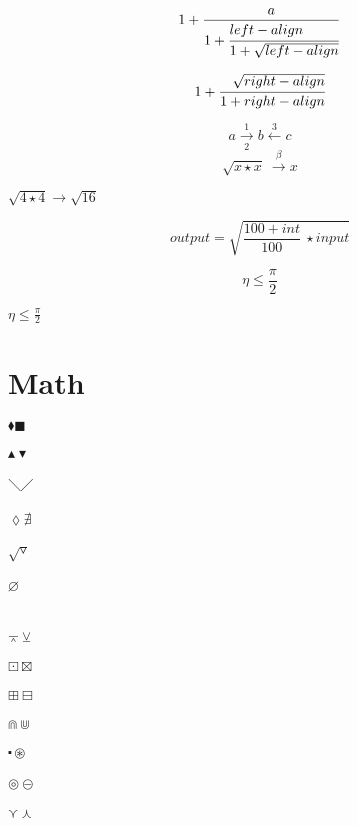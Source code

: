 \documentclass{article}
\begin{document}
$$1+\frac{a}{1+\cfrac[l]{left-align}{1 + \sqrt{left-align}}}$$

$$1+\cfrac[r]{\sqrt{right-align}}{1 + right-align}$$

$$a \xrightarrow[2]{1} b \xleftarrow{3} c$$
$$\sqrt{x \star x}~\xrightarrow{\beta} x$$

$\sqrt{4 \star 4}\rightarrow\sqrt{16}$

$$output = \sqrt{\frac{100+int}{100} ~\star input}$$

$$\boxed{\eta \leq \frac{\pi}{2}}$$

$\boxed{\eta \leq \frac{\pi}{2}}$

\section{Math}
$\blacklozenge \blacksquare $\\\\
$\blacktriangle \blacktriangledown $\\\\
$\diagdown \diagup $\\\\
$\lozenge \nexists $\\\\
$\surd \triangledown$\\\\
$\varnothing $\\\\      
\\
$\barwedge \veebar $\\\\
$\boxdot \boxtimes $\\\\
$\boxplus \boxminus $\\\\
$\Cap \Cup $\\\\
$\centerdot \circledast $\\\\
$\circledcirc \circleddash $\\\\
$\curlyvee \curlywedge $\\\\
\end{document}
